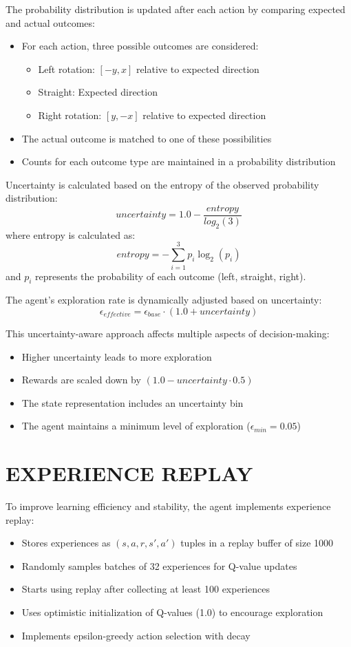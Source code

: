 \documentclass[letterpaper, 10 pt, conference]{ieeeconf}
\begin{document}
The probability distribution is updated after each action by comparing expected and actual outcomes:
\begin{itemize}
    \item For each action, three possible outcomes are considered:
    \begin{itemize}
        \item Left rotation: $[-y, x]$ relative to expected direction
        \item Straight: Expected direction
        \item Right rotation: $[y, -x]$ relative to expected direction
    \end{itemize}
    \item The actual outcome is matched to one of these possibilities
    \item Counts for each outcome type are maintained in a probability distribution
\end{itemize}

Uncertainty is calculated based on the entropy of the observed probability distribution:
\[
uncertainty = 1.0 - \frac{entropy}{log_2(3)}
\]
where entropy is calculated as:
\[
entropy = -\sum_{i=1}^{3} p_i \log_2(p_i)
\]
and $p_i$ represents the probability of each outcome (left, straight, right).

The agent's exploration rate is dynamically adjusted based on uncertainty:
\[
\epsilon_{effective} = \epsilon_{base} \cdot (1.0 + uncertainty)
\]

This uncertainty-aware approach affects multiple aspects of decision-making:
\begin{itemize}
    \item Higher uncertainty leads to more exploration
    \item Rewards are scaled down by $(1.0 - uncertainty \cdot 0.5)$
    \item The state representation includes an uncertainty bin
    \item The agent maintains a minimum level of exploration ($\epsilon_{min} = 0.05$)
\end{itemize}

\section{EXPERIENCE REPLAY}
To improve learning efficiency and stability, the agent implements experience replay:
\begin{itemize}
    \item Stores experiences as $(s, a, r, s', a')$ tuples in a replay buffer of size 1000
    \item Randomly samples batches of 32 experiences for Q-value updates
    \item Starts using replay after collecting at least 100 experiences
    \item Uses optimistic initialization of Q-values (1.0) to encourage exploration
    \item Implements epsilon-greedy action selection with decay
\end{itemize}
\end{document}
